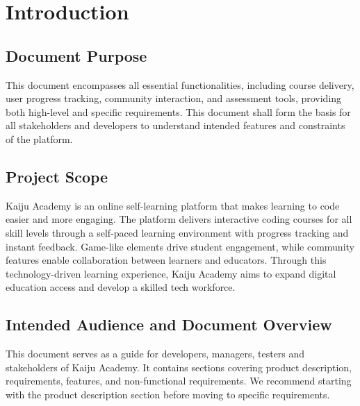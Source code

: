 \documentclass[a4paper, 11pt]{scrreprt}
\begin{document}
\clearpage
{}  %

\chapter{Introduction}
\section{Document Purpose}
This document encompasses all essential functionalities,
including course delivery, user progress tracking, community interaction, and assessment tools, providing both
high-level and specific requirements. This document shall form the basis for all stakeholders and developers to
understand intended features and constraints of the platform.

\section{Project Scope}
Kaiju Academy is an online self-learning platform that makes learning to code easier and more engaging. The platform delivers interactive coding courses for all skill levels through a self-paced learning environment with progress tracking and instant feedback. Game-like elements drive student engagement, while community features enable collaboration between learners and educators. Through this technology-driven learning experience, Kaiju Academy aims to expand digital education access and develop a skilled tech workforce.

\section{Intended Audience and Document Overview}
This document serves as a guide for developers, managers, testers and stakeholders of Kaiju Academy. It contains sections covering product description, requirements, features, and non-functional requirements. We recommend starting with the product description section before moving to specific requirements.
\end{document}
